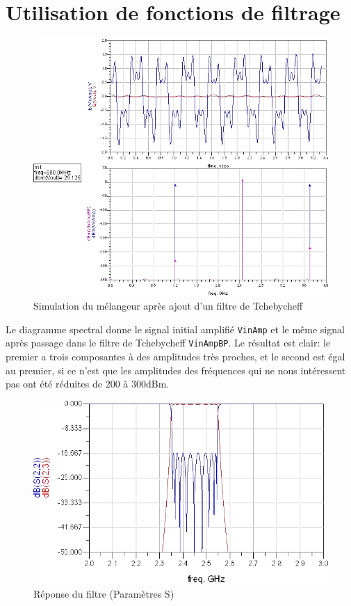 \documentclass[10pt]{article}
\begin{document}
\section{Utilisation de fonctions de filtrage}

\begin{figure}
    \begin{center}
        \includegraphics{p8_simu_circuit_2}
    \end{center}
    \caption{Simulation du mélangeur après ajout d’un filtre de Tchebycheff}
\end{figure}

Le diagramme spectral donne le signal initial amplifié \verb|VinAmp| et le même signal après passage dans
le filtre de Tchebycheff \verb|VinAmpBP|. Le résultat est clair: le premier a trois composantes à des 
amplitudes très proches, et le second est égal au premier, si ce n’est que les amplitudes des fréquences
qui ne nous intéressent pas ont été réduites de 200 à 300dBm.

\begin{figure}
    \begin{center}
        \includegraphics{p8_simu_ordre9_parametre_S}
    \end{center}
    \caption{Réponse du filtre (Paramètres S)}
\end{figure}
\end{document}
